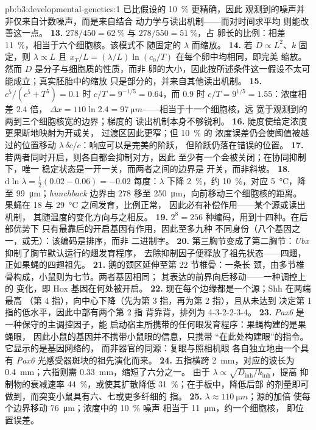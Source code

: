 \begin{solution}{pb:b3:developmental-genetics:1}
已比假设的 \qty{10}{\%} 更精确，因此
观测到的噪声并非仅来自计数噪声，而是来自结合
动力学与读出机制——而对时间求平均
则能改善这一点。
\textbf{13.} $278/450 = \qty{62}{\%}$ 与 $278/550 = \qty{51}{\%}$，占
卵长的比例：相差 \qty{11}{\%}，相当于六个细胞核。该模式不
随固定的 $\lambda$ 而缩放。
\textbf{14.} 若 $D \propto L^{2}$、$k$ 固定，则 $\lambda \propto L$ 且
$x_{T}/L = (\lambda/L)\ln(c_{0}/T)$ 在每个卵中均相同，即完美
缩放。然而 $D$ 是分子与细胞质的性质，而非
卵的大小，因此按所述条件这一假设不太可能成立；真实胚胎中的缩放
只是部分的，并来自其他读出机制。
\textbf{15.} $c^{5}/(c^{5} + T^{5}) = 0.1$ 时 $c/T = 9^{-1/5} = 0.64$，而
$0.9$ 时 $c/T = 9^{1/5} = 1.55$：浓度相差 $2.4$ 倍，
$\Delta x = 110\ln 2.4 = \qty{97}{\micro m}$——相当于十一个细胞核，远
宽于观测到的两到三个细胞核宽的边界；梯度的
读出机制本身不够锐利。
\textbf{16.} 陡度使给定浓度更果断地映射为开或关，
过渡区因此更窄；但 \qty{10}{\%} 的
浓度误差仍会使阈值被越过的位置移动
$\lambda\,\delta c/c$：响应可以是完美的阶跃，
但阶跃仍落在错误的位置。
\textbf{17.} 若两者同时开启，则各自都会抑制对方，因此
至少有一个会被关闭；在协同抑制下，唯一
稳定状态是一开一关，而两者之间的边界是
开关，而非斜坡。
\textbf{18.} $\mathrm{d}\ln\lambda = \tfrac{1}{2}(0.02 - 0.06) = -0.02$
每度：$\lambda$ 下降 \qty{2}{\%}，约 \qty{10}{\%}，对应
\qty{5}{\celsius}，降至 \qty{99}{\micro m}；\emph{hunchback}
边界由 $278$ 移至 \qty{250}{\micro m}，向前移动三个细胞核的距离。
果蝇在 \qty{18}{} 与 \qty{29}{\celsius} 之间发育，比例正常，
因此必有补偿作用——某个源或读出机制，
其随温度的变化方向与之相反。
\textbf{19.} $2^{8} = 256$ 种编码，用到十四种。在后部优势下
只有最靠后的开启基因有作用，因此至多九种
不同身份（八个基因之一，或无）：该编码是排序，而非
二进制字。
\textbf{20.} 第三胸节变成了第二胸节：\emph{Ubx}
抑制了胸节默认运行的翅发育程序，
去除抑制因子便释放了祖先状态——四翅，
正如果蝇的四翅祖先。
\textbf{21.} 鹅的颈区延伸至第 22 节椎骨：一条长
颈，由多节椎骨构成，小鼠则为七节。两者基因相同；
其表达的前界向后移动——一种调控上的
变化，即 Hox 基因在何处被开启。
\textbf{22.} 现在每个边缘都是一个源；Shh 在两端最高
（第 4 指），向中心下降（先为第 3 指，再为第 2 指），且从未达到
决定第 1 指的低水平，因此中部有两个第 2 指
背靠背，排列为 4-3-2-2-3-4。
\textbf{23.} \emph{Pax6} 是一种保守的主调控因子，能
启动宿主所携带的任何眼发育程序：果蝇构建的是果蝇眼，
因此小鼠的基因并不携带小鼠眼的信息，只携带
“在此处构建眼”的指令。它显示的是基因网络的，
而非器官的同源：复眼与照相机眼
各自独立地由一个具有 \emph{Pax6}
光感受器斑块的祖先演化而来。
\textbf{24.} 五指横跨 \qty{2}{mm}，对应的波长为
\qty{0.4}{mm}；六指则需 \qty{0.33}{mm}，缩短了六分之一。
由于 $\lambda \propto \sqrt{D_{\mathrm{inh}}/k_{\mathrm{inh}}}$，提高
抑制物的衰减速率 \qty{44}{\%}，或使其扩散降低
\qty{31}{\%}；在手板中，降低后部 的剂量即可做到，而突变小鼠具有六、七或更多纤细的
指。
\textbf{25.} $\lambda \approx \qty{110}{\micro m}$；源的加倍
使每个边界移动 \qty{76}{\micro m}；浓度中的 \qty{10}{\%} 噪声
相当于 \qty{11}{\micro m}，约一个细胞核，
即位置误差。
\end{solution}
